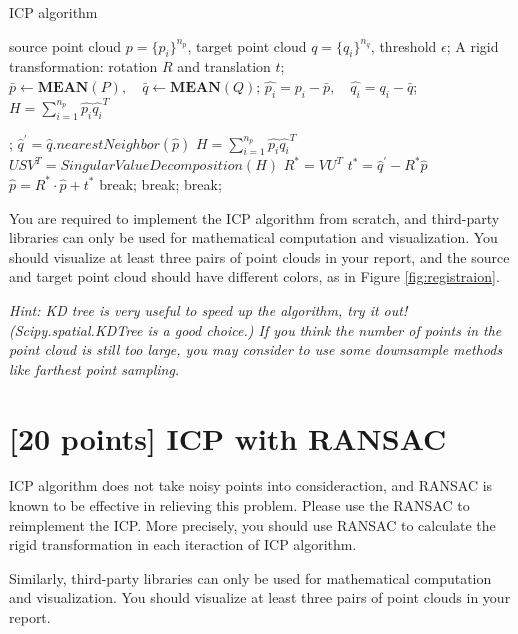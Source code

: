 \documentclass[]{article}
\begin{document}
\begin{algorithm}[h]
\caption{ICP algorithm}\label{alg:icp}
\begin{algorithmic}
\Require source point cloud $p=\{p_i\}^{n_p}$, target point cloud $q=\{q_i\}^{n_q}$, threshold $\epsilon$;
\Ensure A rigid transformation: rotation $R$ and translation $t$;
\State $\bar p \leftarrow \textbf{MEAN}(P), \quad \bar q \leftarrow \textbf{MEAN}(Q)$;
\State $\hat{p_i} = p_i - \bar{p}, \quad \hat{q_i} = q_i - \bar{q}$;
\State $H = \sum_{i=1}^{n_p}{\hat{p_i}\hat{q_i}^T}$

;
\State $\hat{q}^{'} = \hat{q}.nearestNeighbor(\hat{p})$ 
\State $H = \sum_{i=1}^{n_p}{\hat{p_i}\hat{q_i}^T}$
\State $USV^T = SingularValueDecomposition(H)$
\State $ R^* = VU^T$
\State $ t^* = \hat{q}^{'}-R^*\hat{p}$
\State $\hat{p} = R^*\cdot \hat{p} + t^*$
break;
break;
break;
\Endif
\Endwhile
\end{algorithmic}
\end{algorithm}
You are required to implement the ICP algorithm from scratch, and third-party libraries can only be used for mathematical computation and visualization. You should visualize at least three pairs of point clouds in your report, and the source and target point cloud should have different colors, as in Figure \ref{fig:registraion}.

\emph{Hint: KD tree is very useful to speed up the algorithm, try it out! (Scipy.spatial.KDTree is a good choice.) If you think the number of points in the point cloud is still too large, you may consider to use some downsample methods like farthest point sampling.}


\section{[20 points] ICP with RANSAC} 
ICP algorithm does not take noisy points into consideraction, and RANSAC is known to be effective in relieving this problem. Please use the RANSAC to reimplement the ICP. More precisely, you should use RANSAC to calculate the rigid transformation in each iteraction of ICP algorithm.

Similarly, third-party libraries can only be used for mathematical computation and visualization. You should visualize at least three pairs of point clouds in your report.
\end{document}
